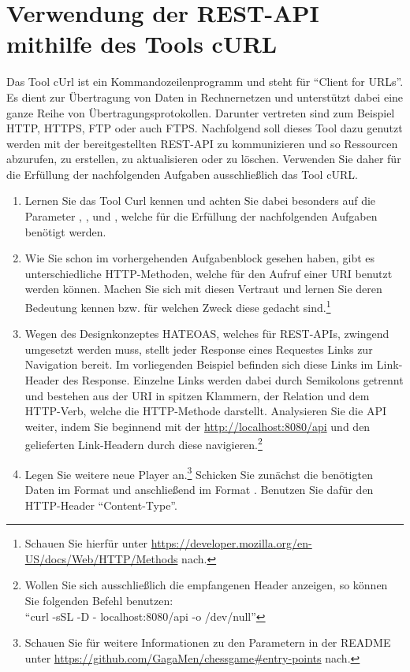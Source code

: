 \section{Verwendung der REST-API mithilfe des Tools cURL}
Das Tool cUrl ist ein Kommandozeilenprogramm und steht für \enquote{Client for \glspl{URL}}. Es dient zur Übertragung von Daten in Rechnernetzen und unterstützt dabei eine ganze Reihe von Übertragungsprotokollen. Darunter vertreten sind zum Beispiel HTTP, HTTPS, FTP oder auch FTPS. Nachfolgend soll dieses Tool dazu genutzt werden mit der bereitgestellten \gls{REST}-\gls{API} zu kommunizieren und so Ressourcen abzurufen, zu erstellen, zu aktualisieren oder zu löschen. Verwenden Sie daher für die Erfüllung der nachfolgenden Aufgaben ausschließlich das Tool cURL.
\begin{enumerate}
	\item Lernen Sie das Tool Curl kennen und achten Sie dabei besonders auf die Parameter , ,  und , welche für die Erfüllung der nachfolgenden Aufgaben benötigt werden.
	\item Wie Sie schon im vorhergehenden Aufgabenblock gesehen haben, gibt es unterschiedliche \gls{HTTP}-Methoden, welche für den Aufruf einer \gls{URI} benutzt werden können. Machen Sie sich mit diesen Vertraut und lernen Sie deren Bedeutung kennen bzw. für welchen Zweck diese gedacht sind.\footnote{Schauen Sie hierfür unter \url{https://developer.mozilla.org/en-US/docs/Web/HTTP/Methods} nach.}
	\item Wegen des Designkonzeptes HATEOAS, welches für \gls{REST}-\glspl{API}, zwingend umgesetzt werden muss, stellt jeder Response eines Requestes Links zur Navigation bereit. Im vorliegenden Beispiel befinden sich diese Links im Link-Header des Response. Einzelne Links werden dabei durch Semikolons getrennt und bestehen aus der \gls{URI} in spitzen Klammern, der Relation und dem \gls{HTTP}-Verb, welche die \gls{HTTP}-Methode darstellt. Analysieren Sie die \gls{API} weiter, indem Sie beginnend mit der \url{http://localhost:8080/api} und den gelieferten Link-Headern durch diese navigieren.\footnote{Wollen Sie sich ausschließlich die empfangenen Header anzeigen, so können Sie folgenden Befehl benutzen:\\\enquote{curl -sSL -D - localhost:8080/api -o /dev/null}}
	\item Legen Sie weitere neue Player an.\footnote{\label{foot:readmeEntryPoints}Schauen Sie für weitere Informationen zu den Parametern in der README unter \url{https://github.com/GagaMen/chessgame\#entry-points} nach.} Schicken Sie zunächst die benötigten Daten im Format  und anschließend im Format . Benutzen Sie dafür den \gls{HTTP}-Header \enquote{Content-Type}.

\end{enumerate}
